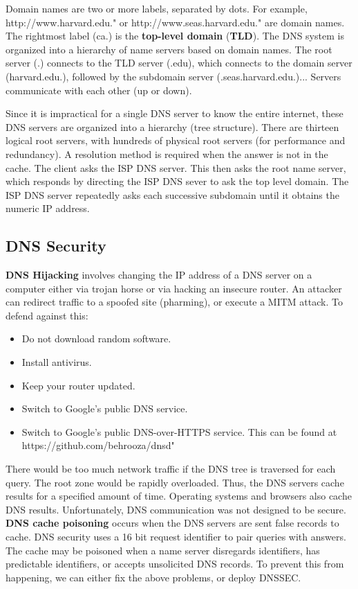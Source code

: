 \documentclass[11pt]{article}
\theoremstyle{plain} %
\theoremstyle{definition}
\theoremstyle{example}
\theoremstyle{remark}
\def\url#1{\expandafter\string\csname #1\endcsname}
\begin{document}
Domain names are two or more labels, separated by dots. For example,  \url{http://www.harvard.edu.}" or \url{http://www.seas.harvard.edu.}" are domain names. The rightmost label (ca.) is the \textbf{top-level domain} (\textbf{TLD}). The DNS system is organized into a hierarchy of name servers based on domain names. The root server (.) connects to the TLD server (.edu), which connects to the domain server (harvard.edu.), followed by the subdomain server (.seas.harvard.edu.)... Servers communicate with each other (up or down). 

Since it is impractical for a single DNS server to know the entire internet, these DNS servers are organized into a hierarchy (tree structure). There are thirteen logical root servers, with hundreds of physical root servers (for performance and redundancy). A resolution method is required when the answer is not in the cache. The client asks the ISP DNS server. This then asks the root name server, which responds by directing the ISP DNS sever to ask the top level domain. The ISP DNS server repeatedly asks each successive subdomain until it obtains the numeric IP address. 

\subsection{DNS Security}
\textbf{DNS Hijacking} involves changing the IP address of a DNS server on a computer either via trojan horse or via hacking an insecure router. An attacker can redirect traffic to a spoofed site (pharming), or execute a MITM attack. To defend against this:
\begin{itemize}
	\item Do not download random software.
	\item Install antivirus.
	\item Keep your router updated.
	\item Switch to Google's public DNS service.
	\item Switch to Google's public DNS-over-HTTPS service. This can be found at \url{https://github.com/behrooza/dnsd}"
\end{itemize}

There would be too much network traffic if the DNS tree is traversed for each query. The root zone would be rapidly overloaded. Thus, the DNS servers cache results for a specified amount of time. Operating systems and browsers also cache DNS results. Unfortunately, DNS communication was not designed to be secure. \textbf{DNS cache poisoning} occurs when the DNS servers are sent false records to cache. DNS security uses a 16 bit request identifier to pair queries with answers. The cache may be poisoned when a name server disregards identifiers, has predictable identifiers, or accepts unsolicited DNS records. To prevent this from happening, we can either fix the above problems, or deploy DNSSEC. 
\end{document}
